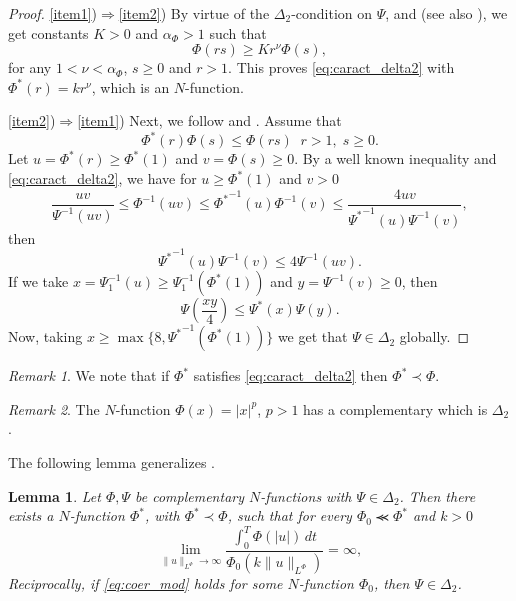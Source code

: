 \documentclass[twoside]{article}
\newtheorem{lem}[thm]{Lemma}
\theoremstyle{remark}
\newtheorem{comentario}{Remark}
\newcommand{\orlnor}{\|_{L^{\Phi}}}
\renewcommand{\leq}{\leqslant}
\renewcommand{\geq}{\geqslant}
\begin{document}
\begin{proof}
\ref{item1})$\Rightarrow$\ref{item2})
By virtue of the $\Delta_2$-condition on $\Psi$, \cite[Thm. 11.7]{M} and \cite[Cor. 11.6]{M} (see also  \cite[Eq. (2.8)]{AGMS}), we get constants $K>0$ and $\alpha_{\Phi}>1$ such that
\begin{equation}\label{delta2-consecuencia}
\Phi(r s)\geq Kr^{\nu}\Phi(s),
\end{equation}
for any $1<\nu<\alpha_{\Phi}$,  $s\geq 0$ and $r>1$. This proves  \eqref{eq:caract_delta2} with $\Phi^*(r)=kr^\nu$, which is an $N$-function.

\ref{item2})$\Rightarrow$\ref{item1})
Next, we follow  \cite[p. 32, Prop. 13]{rao1991theory} and \cite[p. 29, Prop. 9]{rao1991theory}.
Assume that 
\[
\Phi^*(r)\Phi(s)\leq \Phi(rs)\;\;r>1,\;s\geq 0.
\]
Let $u=\Phi^*(r)\geq \Phi^*(1)$ and $v=\Phi(s)\geq 0$. By a well known inequality \cite[p. 13, Prop. 1]{rao1991theory} and \eqref{eq:caract_delta2},  we have  for $u\geq \Phi^*(1)$ and $v> 0$
\[
\frac{uv}{\Psi^{-1}(uv)}\leq \Phi^{-1}(uv)\leq{\Phi^*}^{-1}(u)\Phi^{-1}(v)\leq
\frac{4uv}{{\Psi^*}^{-1}(u)\Psi^{-1}(v)},
\]
then 
\[
{\Psi^*}^{-1}(u)\Psi^{-1}(v)\leq 4 \Psi^{-1}(uv).
\]
If we take $x=\Psi^{-1}_1(u)\geq \Psi^{-1}_1(\Phi^*(1))$ and $y=\Psi^{-1}(v)\geq 0$, then 
\[
\Psi\left(\frac{xy}{4}\right)\leq \Psi^*(x)\Psi(y).
\]
Now, taking  $x\geq \max\{8,{\Psi^*}^{-1}(\Phi^*(1))\}$ we get that $\Psi \in \Delta_2$ globally.
\end{proof}

\begin{comentario} We note that if $\Phi^*$ satisfies \eqref{eq:caract_delta2} then $\Phi^*\prec \Phi$.
 \end{comentario}

\begin{comentario}  The $N$-function $\Phi(x)=|x|^p$, $p>1$ has a complementary which is $\Delta_2$. 
 \end{comentario}

The following lemma generalizes \cite[Lemma 5.2]{ABGMS2015}.

\begin{lem}\label{lem_coer}
Let $\Phi,\Psi$ be complementary $N$-functions with $\Psi \in \Delta_2$. Then there exists a $N$-function $\Phi^*$, with $\Phi^*\prec\Phi$, such that  for every $\Phi_0\llcurly\Phi^*$ and $k>0$
\begin{equation}\label{eq:coer_mod}
\lim\limits_{\|u\orlnor\to \infty}
\frac{\int_0^T \Phi(|u|)\,dt}{\Phi_0(k\|u\orlnor)}=\infty,
\end{equation}
Reciprocally, if  \eqref{eq:coer_mod} holds for some $N$-function $\Phi_0$,  then $\Psi\in\Delta_2$.
\end{lem}
\end{document}
